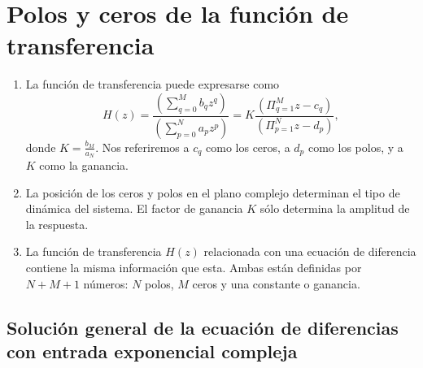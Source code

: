 \section{Polos y ceros de la funci\'{o}n de transferencia}

\begin{enumerate}

\item La funci\'{o}n de transferencia puede expresarse como 
\begin{equation}
H\left( z\right) =
        \frac{\left( \sum_{q=0}^{M}b_{q}z^{q}\right) }{\left(\sum_{p=0}^{N}a_{p}z^{p}\right) }=
        K\frac{\left(\Pi _{q=1}^{M} z-c_{q} \right)}
         {\left(\Pi _{p=1}^{N} z-d_{p} \right)},
\end{equation}
donde $K=\frac{b_{M}}{a_{N}}$.
Nos referiremos a $c_{q}$ como los ceros, 
a $d_{p}$ como los polos, y a $K$ como la ganancia.

\item La posici\'{o}n de los ceros y polos en el plano complejo determinan el tipo de din\'{a}mica 
del sistema. El factor de ganancia $K$ s\'{o}lo determina la amplitud de la respuesta.

\item La funci\'{o}n de transferencia $H\left( z\right) $ relacionada con una ecuaci\'{o}n de 
diferencia contiene la misma informaci\'{o}n que esta. Ambas est\'{a}n definidas por $N+M+1$ 
n\'{u}meros: $N$ polos, $M$ ceros y una constante o ganancia.

\end{enumerate}

\subsection{Soluci\'{o}n general de la ecuaci\'{o}n de diferencias con entrada exponencial compleja}

